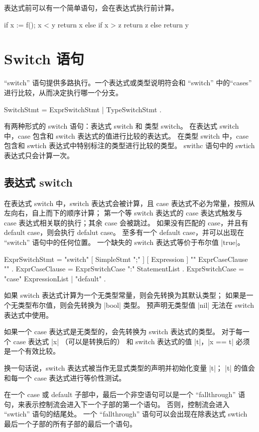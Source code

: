 表达式前可以有一个简单语句，会在表达式执行前计算。
\begin{golang}
if x := f(); x < y {
	return x
} else if x > z {
	return z
} else {
	return y
}
\end{golang}

\section{Switch 语句}
``switch'' 语句提供多路执行。一个表达式或类型说明符会和 ``switch'' 中的``cases'' 进行比较，从而决定执行哪一个分支。
\begin{EBNF}
SwitchStmt = ExprSwitchStmt | TypeSwitchStmt .
\end{EBNF}
有两种形式的 switch  语句：表达式 switch 和 类型 switch。
在表达式 switch 中，case 包含和 switch 表达式的值进行比较的表达式。
在类型 switch 中，case 包含和 swtich 表达式中特别标注的类型进行比较的类型。
swithc 语句中的 swtich 表达式只会计算一次。

\subsection{表达式 switch}
在表达式 switch 中，switch 表达式会被计算，且 case 表达式不必为常量，按照从左向右，自上而下的顺序计算；
第一个等 switch 表达式的 case 表达式触发与 case 表达式相关联的执行；其余 case 会被跳过。
如果没有匹配的 case，并且有 default case，则会执行  defalut case。
至多有一个 default case，并可以出现在 ``switch'' 语句中的任何位置。
一个缺失的 switch 表达式等价于布尔值 \code|true|。
\begin{EBNF}
ExprSwitchStmt = "switch" [ SimpleStmt ";" ] [ Expression ] "{" { ExprCaseClause } "}" .
ExprCaseClause = ExprSwitchCase ":" StatementList .
ExprSwitchCase = "case" ExpressionList | "default" .
\end{EBNF}

如果 switch 表达式计算为一个无类型常量，则会先转换为其默认类型；
如果是一个无类型布尔值，则会先转换为 \code|bool| 类型。
预声明无类型值 \code|nil| 无法在 switch 表达式中使用。

如果一个 case 表达式是无类型的，会先转换为 switch 表达式的类型。
对于每一个 case 表达式 \code|x| （可以是转换后的） 和 switch 表达式的值 \code|t|，\code|x == t| 必须是一个有效比较。

换一句话说，switch 表达式被当作无显式类型的声明并初始化变量 \code|t|；
\code|t| 的值会和每一个 case 表达式进行等价性测试。

在一个 case 或 default 子部中，最后一个非空语句可以是一个 ``fallthrough'' 语句，来表示控制流会进入下一个子部的第一个语句。
否则，控制流会进入 ``swtich'' 语句的结尾处。
一个 ``fallthrough'' 语句可以会出现在除表达式 swtich 最后一个子部的所有子部的最后一个语句。

